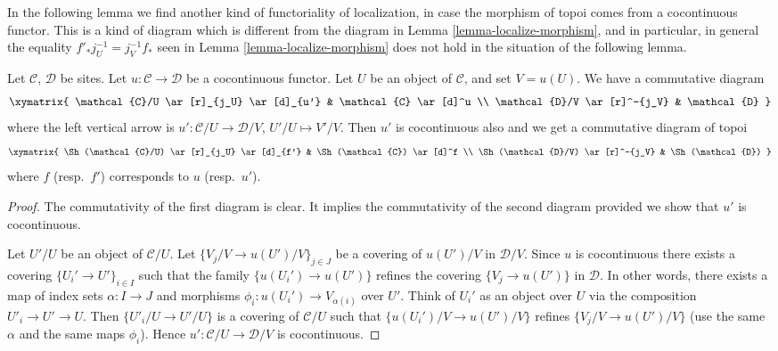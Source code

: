 \noindent
In the following lemma we find another kind of functoriality of
localization, in case the morphism of topoi comes from a
cocontinuous functor. This is a kind of diagram which is different
from the diagram in
Lemma \ref{lemma-localize-morphism},
and in particular, in general the equality $f'_*j_U^{-1} = j_V^{-1}f_*$ seen in
Lemma \ref{lemma-localize-morphism}
does not hold in the situation of the following lemma.

\begin{lemma}
\label{lemma-localize-cocontinuous}
Let $\mathcal{C}$, $\mathcal{D}$ be sites.
Let $u : \mathcal{C} \to \mathcal{D}$ be a cocontinuous functor.
Let $U$ be an object of $\mathcal{C}$, and set $V = u(U)$.
We have a commutative diagram
$$
\xymatrix{
\mathcal{C}/U \ar[r]_{j_U} \ar[d]_{u'} & \mathcal{C} \ar[d]^u \\
\mathcal{D}/V \ar[r]^-{j_V} & \mathcal{D}
}
$$
where the left vertical arrow is
$u' : \mathcal{C}/U \to \mathcal{D}/V$, $U'/U \mapsto V'/V$.
Then $u'$ is cocontinuous also and we get a commutative diagram of topoi
$$
\xymatrix{
\Sh(\mathcal{C}/U) \ar[r]_{j_U} \ar[d]_{f'} &
\Sh(\mathcal{C}) \ar[d]^f \\
\Sh(\mathcal{D}/V) \ar[r]^-{j_V} &
\Sh(\mathcal{D})
}
$$
where $f$ (resp.\ $f'$) corresponds to $u$ (resp.\ $u'$).
\end{lemma}

\begin{proof}
The commutativity of the first diagram is clear.
It implies the commutativity of the second diagram provided we
show that $u'$ is cocontinuous.

\medskip\noindent
Let $U'/U$ be an object of $\mathcal{C}/U$.
Let $\{V_j/V \to u(U')/V\}_{j \in J}$ be a covering of $u(U')/V$
in $\mathcal{D}/V$. Since $u$ is cocontinuous there exists a
covering $\{U_i' \to U'\}_{i \in I}$ such that the family
$\{u(U_i') \to u(U')\}$ refines the covering
$\{V_j \to u(U')\}$ in $\mathcal{D}$. In other words, there exists
a map of index sets $\alpha : I \to J$ and morphisms
$\phi_i : u(U_i') \to V_{\alpha(i)}$ over $U'$.
Think of $U_i'$ as an object over
$U$ via the composition $U'_i \to U' \to U$. Then
$\{U'_i/U \to U'/U\}$ is a covering of $\mathcal{C}/U$ such that
$\{u(U_i')/V \to u(U')/V\}$ refines $\{V_j/V \to u(U')/V\}$
(use the same $\alpha$ and the same maps $\phi_i$). Hence
$u' : \mathcal{C}/U \to \mathcal{D}/V$ is cocontinuous.
\end{proof}

